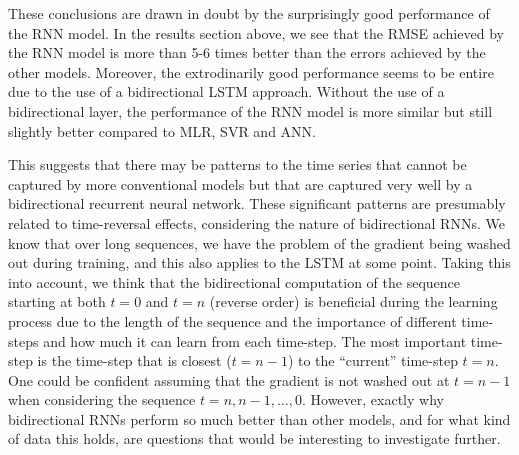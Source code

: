 \documentclass[11pt]{article}
\begin{document}
These conclusions are drawn in doubt by the surprisingly good performance of the RNN model.
In the results section above, we see that the RMSE achieved by the RNN model is more than 5-6 times better than the errors achieved by the other models.
Moreover, the extrodinarily good performance seems to be entire due to the use of a bidirectional LSTM approach.
Without the use of a bidirectional layer, the performance of the RNN model is more similar but still slightly better compared to MLR, SVR and ANN.

This suggests that there may be patterns to the time series that cannot be captured by more conventional models but that are captured very well by a bidirectional recurrent neural network.
These significant patterns are presumably related to time-reversal effects, considering the nature of bidirectional RNNs. We know that over long sequences, we have the problem of the gradient being washed out during training, and this also applies to the LSTM at some point. Taking this into account, we think that the bidirectional computation of the sequence starting at both $t = 0$ and $t = n$ (reverse order) is beneficial during the learning process due to the length of the sequence and the importance of different time-steps and how much it can learn from each time-step. The most important time-step is the time-step that is closest ($t = n-1$) to the ``current'' time-step $t = n$. One could be confident assuming that the gradient is not washed out at $t = n-1$ when considering the sequence $t = n, n-1, \dots, 0$. However, exactly why bidirectional RNNs perform so much better than other models, and for what kind of data this holds, are questions that would be interesting to investigate further.




\printbibliography
\end{document}
